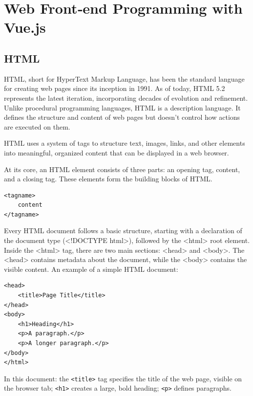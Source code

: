 \chapter{Web Front‑end Programming with Vue.js}
\section{HTML}
HTML, short for HyperText Markup Language, has been the standard language for creating web pages since its inception in 1991. As of today, HTML 5.2 represents the latest iteration, incorporating decades of evolution and refinement. Unlike procedural programming languages, HTML is a description language. It defines the structure and content of web pages but doesn’t control how actions are executed on them.

HTML uses a system of tags to structure text, images, links, and other elements into meaningful, organized content that can be displayed in a web browser.

At its core, an HTML element consists of three parts: an opening tag, content, and a closing tag. These elements form the building blocks of HTML.

\begin{verbatim}
<tagname>
    content
</tagname>
\end{verbatim}
Every HTML document follows a basic structure, starting with a declaration of the document type (<!DOCTYPE html>), followed by the <html> root element. Inside the <html> tag, there are two main sections: <head> and <body>. The <head> contains metadata about the document, while the <body> contains the visible content.
An example of a simple HTML document:
\begin{verbatim}
<head>
    <title>Page Title</title>
</head>
<body>
    <h1>Heading</h1>
    <p>A paragraph.</p>
    <p>A longer paragraph.</p>
</body>
</html>
\end{verbatim}
In this document: the \texttt{<title>} tag specifies the title of the web page, visible on the browser tab; \texttt{<h1>} creates a large, bold heading; \texttt{<p>} defines paragraphs.

